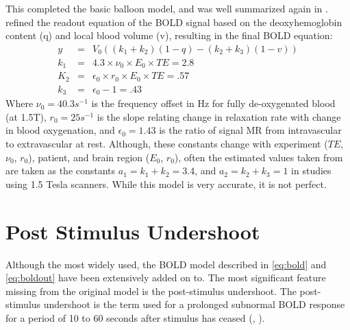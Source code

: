 This completed the basic balloon model, and was well summarized again
in \cite{Riera2003}.  \cite{Obata2004} refined the readout equation 
of the BOLD signal based on the
deoxyhemoglobin content (q) and local blood volume (v), resulting in the
final BOLD equation:
\begin{eqnarray}
y   &=& V_0((k_1 + k_2)(1-q) - (k_2 + k_3)(1-v))\\
k_1 &=& 4.3 \times \nu_0 \times E_0 \times TE = 2.8\\
K_2 &=& \epsilon_0 \times r_0 \times E_0 \times TE = .57\\
k_3 &=& \epsilon_0 - 1 = .43
\label{eq:boldout}
\end{eqnarray}
Where $\nu_0 = 40.3 s^{-1}$  is the frequency offset in Hz for fully
de-oxygenated blood (at 1.5T), $r_0 = 25 s^{-1}$  is the slope relating
change in relaxation rate with change in blood oxygenation, and
$\epsilon_0 = 1.43$ is the 
ratio of signal MR from intravascular to extravascular at rest. Although,
these constants change with experiment ($TE$, $\nu_0$, $r_0$),
patient, and brain 
region ($E_0$, $r_0$), often the estimated values taken from \cite{Obata2004} are 
taken as the constants $a_1 = k_1 + k_2 = 3.4$, and $a_2 = k_2+k_3 = 1$ in 
studies using 1.5 Tesla scanners.
While this model is very accurate, it is not perfect. 

\section{Post Stimulus Undershoot}
\label{sec:Post Stimulus Undershoot}
Although the most widely used, the BOLD model described in \autoref{eq:bold}
and \autoref{eq:boldout} have been extensively added on to. The most
significant feature missing from the original model is the 
post-stimulus undershoot.
The post-stimulus undershoot is the term used for a prolonged subnormal
BOLD response for a period of 10 to 60 seconds after stimulus has
ceased (\cite{Chen2009}, \cite{Mandeville1999a}).

